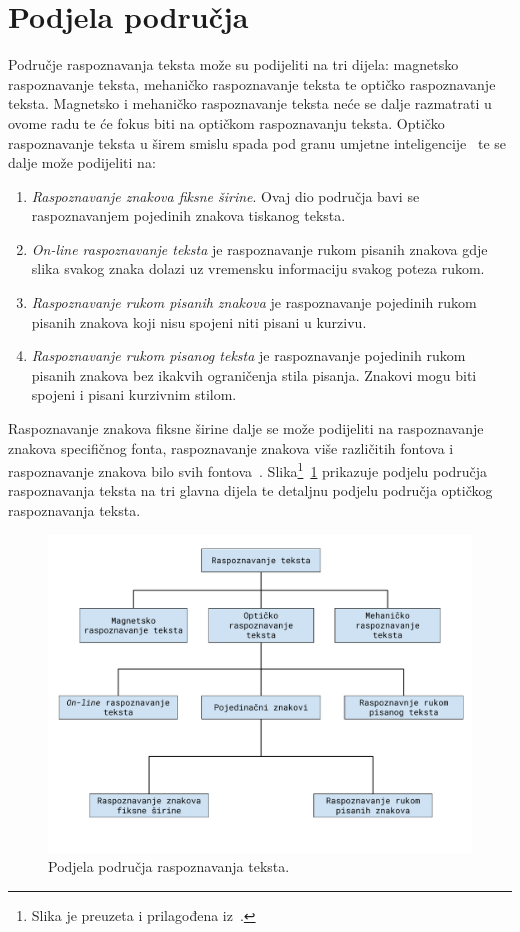 \section{Podjela područja}
\label{sec:podjela-podrucja}
Područje raspoznavanja teksta može su podijeliti na tri dijela: magnetsko raspoznavanje teksta, mehaničko raspoznavanje
teksta te optičko raspoznavanje teksta. Magnetsko i mehaničko raspoznavanje teksta neće se dalje razmatrati u ovome
radu te će fokus biti na optičkom raspoznavanju teksta. Optičko raspoznavanje teksta u širem smislu spada pod granu
umjetne inteligencije\ \citep{mori1999} te se dalje može podijeliti na:
\begin{enumerate}
    \item \emph{Raspoznavanje znakova fiksne širine}. Ovaj dio područja bavi se raspoznavanjem pojedinih znakova
    tiskanog teksta.
    \item \emph{On-line raspoznavanje teksta} je raspoznavanje rukom pisanih znakova gdje slika svakog znaka dolazi uz
    vremensku informaciju svakog poteza rukom.
    \item \emph{Raspoznavanje rukom pisanih znakova} je raspoznavanje pojedinih rukom pisanih znakova koji nisu spojeni
    niti pisani u kurzivu.
    \item \emph{Raspoznavanje rukom pisanog teksta} je raspoznavanje pojedinih rukom pisanih znakova bez ikakvih
    ograničenja stila pisanja. Znakovi mogu biti spojeni i pisani kurzivnim stilom.
\end{enumerate}
Raspoznavanje znakova fiksne širine dalje se može podijeliti na raspoznavanje znakova specifičnog fonta, raspoznavanje
znakova više različitih fontova i raspoznavanje znakova bilo svih fontova\ \citep{govindan1989}.
Slika\footnote{Slika je preuzeta i prilagođena iz\ \citep{mantas1986}.}\ \ref{fig:podjela-podrucja-raspoznavanja-teksta}
prikazuje podjelu područja raspoznavanja teksta na tri glavna dijela te detaljnu podjelu područja optičkog raspoznavanja
teksta.
\begin{figure}[htb]
    \centering
    \includegraphics[width=12cm]{images/chapter2/character-recognition-categories.pdf}
    \caption{Podjela područja raspoznavanja teksta.}
    \label{fig:podjela-podrucja-raspoznavanja-teksta}
\end{figure}
